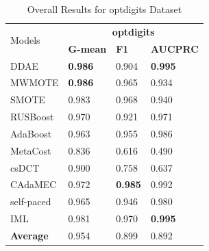 \begin{table}[h]
    \centering
    \renewcommand\arraystretch{0.95} 
    \begin{tabular}{|p{}<{\centering}|p{}<{\centering}|p{}<{\centering}|p{}<{\centering}|}
    \hline
    \multirow{2}{*}{Models} & \multicolumn{3}{c|}{\textbf{optdigits}}    \\ \cline{2-4} 
                             & \textbf{G-mean} & \textbf{F1} & \textbf{AUCPRC} \\ \hline
    DDAE                     & \textbf{0.986}	&0.904	&\textbf{0.995}               \\ \hline
    MWMOTE                   &\textbf{0.986}	&0.965	&0.934              \\ \hline
    SMOTE                    & 0.983	&0.968	&0.940               \\ \hline
    RUSBoost                 &0.970	&0.921	&0.971              \\ \hline
    AdaBoost                 & 0.963	&0.955	&0.986               \\ \hline
    MetaCost                 & 0.836	&0.616	&0.490               \\ \hline
    csDCT                    & 0.900	&0.758	&0.637                \\ \hline
    CAdaMEC                  & 0.972	&\textbf{0.985}	&0.992               \\ \hline
    self-paced               & 0.965	&0.946	&0.980                \\ \hline
    IML                      & 0.981	&0.970	&\textbf{0.995}             \\ \hline\hline
    \textbf{Average}         & 0.954	&0.899	&0.892                \\ \hline
    \end{tabular}
    \vspace{-8pt}
    \caption{Overall Results for optdigits Dataset}
    \label{tab12}
\end{table}
